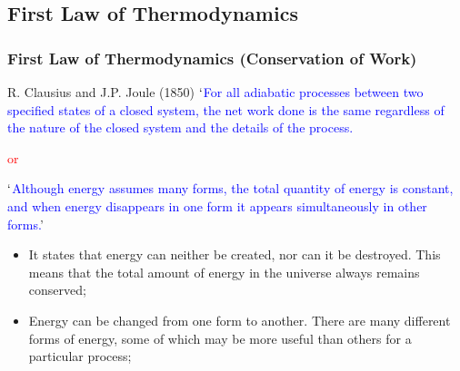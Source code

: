 \documentclass[10pt,compress]{beamer}
\begin{document}
\subsection{First Law of Thermodynamics}
\begin{frame}
 \frametitle{First Law of Thermodynamics (Conservation of Work)}

 \begin{block}{R. Clausius and J.P. Joule (1850)}
  \textcolor{blue}{$\lq$For all adiabatic processes between two specified states of a closed system, the net work done is the same regardless of the nature of the closed system and the details of the process.}
  \begin{center}
   \textcolor{red}{or}
  \end{center}
  \textcolor{blue}{$\lq$Although energy assumes many forms, the total quantity of energy is constant, and when energy disappears in one form it appears simultaneously in other forms.}'
 \end{block}


 \begin{itemize}
  \item<2-> It states that energy can neither be created, nor can it be destroyed. This means that the total amount of energy in the universe always remains conserved;
  \item<3-> Energy can be changed from one form to another. There are many different forms of energy, some of which may be more useful than others for a particular process;
 \end{itemize}

\normalsize
\end{frame}

\end{document}
